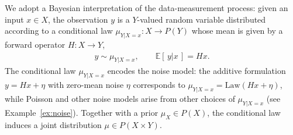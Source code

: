 \documentclass{article}
\theoremstyle{definition}
\theoremstyle{remarksty}
\begin{document}
We adopt a Bayesian interpretation of the data-measurement process: given an input $x \in X$, the observation $y$ is a $Y$-valued random variable distributed according to a conditional law $\mu_{Y|X=x}: X \to P(Y)$ whose mean is given by a forward operator $H: X \to Y$,
\begin{align}\label{eq:forward-operator}
    y \sim \mu_{Y|X=x}, \qquad \mathbb{E}[\,y | x\,] = Hx.
\end{align}
The conditional law $\mu_{Y|X=x}$ encodes the noise model: the additive formulation $y = Hx + \eta$ with zero-mean noise $\eta$ corresponds to $\mu_{Y|X=x} = \mathrm{Law}(Hx + \eta)$, while Poisson and other noise models arise from other choices of $\mu_{Y|X=x}$ (see Example~\ref{ex:noise}). Together with a prior $\mu_X \in P(X)$, the conditional law induces a joint distribution $\mu \in P(X\times Y)$.
\end{document}
